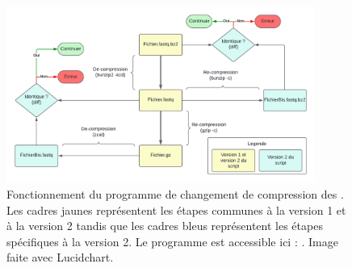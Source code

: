 \documentclass[../main]{subfiles} %
\begin{document}
\addto\extrasfrench{\protected\edef:{\unexpanded\expandafter{:}}}

\begin{figure}[ht]
    \centering
    \includegraphics[width=0.9\textwidth]{../Illustrations/Decompression.png}
    \caption{Fonctionnement du programme de changement de compression des \fastq. Les cadres jaunes représentent les étapes communes à la version 1 et à la version 2 tandis que les cadres bleus représentent les étapes spécifiques à la version 2. Le programme est accessible ici : \cite{florent_f-marchalm1bioinfointernship2024-inrae_agap_ge2pop_2024}. Image faite avec \gls{Lucidchart}.}
    \label{fig:DiagDecompresse}
\end{figure}


\end{document}
